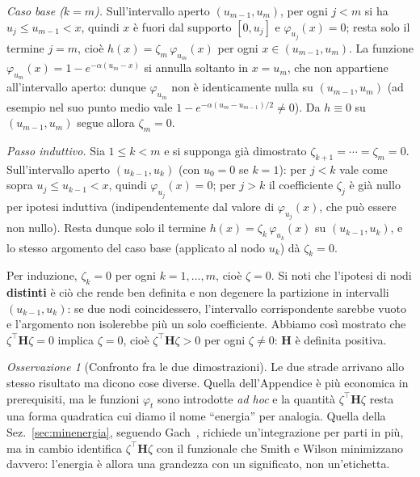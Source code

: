 \documentclass[11pt,a4paper]{article}
\theoremstyle{plain}
\theoremstyle{definition}
\theoremstyle{remark}
\newtheorem*{osservazione}{Osservazione}
\newcommand{\Hmat}{\mathbf{H}}
\newcommand{\transp}{^{\!\top}}
\begin{document}
\emph{Caso base ($k=m$).} Sull'intervallo aperto $(u_{m-1},u_m)$, per ogni $j<m$ si ha
$u_j\le u_{m-1}<x$, quindi $x$ \`e fuori dal supporto $[0,u_j]$ e $\varphi_{u_j}(x)=0$; resta
solo il termine $j=m$, cio\`e $h(x)=\zeta_m\,\varphi_{u_m}(x)$ per ogni $x\in(u_{m-1},u_m)$.
La funzione $\varphi_{u_m}(x)=1-e^{-\alpha(u_m-x)}$ si annulla soltanto in $x=u_m$, che non
appartiene all'intervallo aperto: dunque $\varphi_{u_m}$ non \`e identicamente nulla su
$(u_{m-1},u_m)$ (ad esempio nel suo punto medio vale $1-e^{-\alpha(u_m-u_{m-1})/2}\neq0$). Da
$h\equiv 0$ su $(u_{m-1},u_m)$ segue allora $\zeta_m=0$.

\emph{Passo induttivo.} Sia $1\le k<m$ e si supponga gi\`a dimostrato
$\zeta_{k+1}=\cdots=\zeta_m=0$. Sull'intervallo aperto $(u_{k-1},u_k)$ (con $u_0=0$ se $k=1$):
per $j<k$ vale come sopra $u_j\le u_{k-1}<x$, quindi $\varphi_{u_j}(x)=0$; per $j>k$ il
coefficiente $\zeta_j$ \`e gi\`a nullo per ipotesi induttiva (indipendentemente dal valore di
$\varphi_{u_j}(x)$, che pu\`o essere non nullo). Resta dunque solo il termine
$h(x)=\zeta_k\,\varphi_{u_k}(x)$ su $(u_{k-1},u_k)$, e lo stesso argomento del caso base
(applicato al nodo $u_k$) d\`a $\zeta_k=0$.

Per induzione, $\zeta_k=0$ per ogni $k=1,\ldots,m$, cio\`e $\zeta=0$. Si noti che l'ipotesi di
nodi \textbf{distinti} \`e ci\`o che rende ben definita e non degenere la partizione in
intervalli $(u_{k-1},u_k)$: se due nodi coincidessero, l'intervallo corrispondente sarebbe
vuoto e l'argomento non isolerebbe pi\`u un solo coefficiente. Abbiamo cos\`i mostrato che
$\zeta\transp\Hmat\zeta=0$ implica $\zeta=0$, cio\`e $\zeta\transp\Hmat\zeta>0$ per ogni
$\zeta\neq 0$: $\Hmat$ \`e definita positiva.

\begin{osservazione}[Confronto fra le due dimostrazioni]
Le due strade arrivano allo stesso risultato ma dicono cose diverse. Quella
dell'Appendice \`e pi\`u economica in prerequisiti, ma le funzioni $\varphi_t$ sono
introdotte \emph{ad hoc} e la quantit\`a $\zeta\transp\Hmat\zeta$ resta una forma quadratica
cui diamo il nome ``energia'' per analogia. Quella della Sez.~\ref{sec:minenergia}, seguendo
Gach~\cite{gach2017}, richiede un'integrazione per parti in pi\`u, ma in cambio identifica
$\zeta\transp\Hmat\zeta$ con il funzionale che Smith e Wilson minimizzano davvero: l'energia
\`e allora una grandezza con un significato, non un'etichetta.
\end{osservazione}
\end{document}
